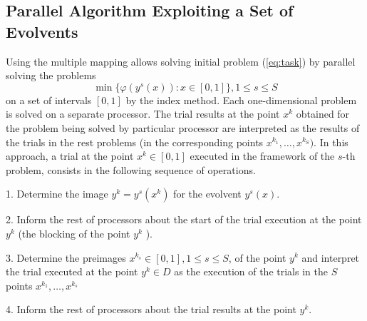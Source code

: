 \documentclass[runningheads]{llncs}
\begin{document}
\subsection{Parallel Algorithm Exploiting a Set of Evolvents}
\label{sec:parallel_evolvents}
Using the multiple mapping allows solving initial problem (\ref{eq:task}) by parallel solving the
problems
\[
\min\{\varphi(y^s(x)):x\in [0,1]\}, 1\leqslant s\leqslant S
\]
on a set of intervals $[0,1]$ by the index method. Each one-dimensional problem is solved on a
separate processor. The trial results at the point \(x^k\) obtained for the problem being solved by
particular processor are interpreted as the results of the trials in the rest problems (in the
corresponding points \(x^{k_1},\dots,x^{k_S})\). In this approach, a trial at the point \(x^k \in
[0,1]\) executed in the framework of the \(s\)-th problem, consists in the following sequence of
operations.
\par
1. Determine the image \(y^k=y^s (x^k)\) for the evolvent \(y^s (x)\).
\par
2. Inform the rest of processors about the start of the trial execution at the point \( y^k\) (the
blocking of the point \(y^k\) ).
\par
3. Determine the preimages \(x{}^{k_s}  \in [0,1], 1\leqslant s\leqslant S\), of the point \(y^k\) and interpret the
trial executed at the point \(y^k \in D \) as the execution of the trials in the \(S\) points
\(x{}^{k_1} ,\dots,x{}^{k_s} \)
\par
4. Inform the rest of processors about the trial results at the point \(y^k\).
\par
\end{document}
